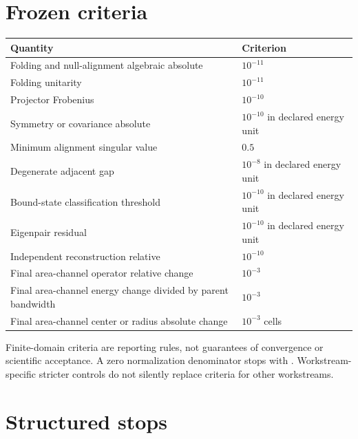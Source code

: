 \documentclass[11pt]{article}
\begin{document}
\section{Frozen criteria}

\begin{center}
\small
\begin{tabularx}{\textwidth}{Y>{\raggedleft\arraybackslash}p{0.28\textwidth}}
\toprule
\textbf{Quantity} & \textbf{Criterion} \\
\midrule
Folding and null-alignment algebraic absolute & $10^{-11}$ \\
Folding unitarity & $10^{-11}$ \\
Projector Frobenius & $10^{-10}$ \\
Symmetry or covariance absolute & $10^{-10}$ in declared energy unit \\
Minimum alignment singular value & $0.5$ \\
Degenerate adjacent gap & $10^{-8}$ in declared energy unit \\
Bound-state classification threshold & $10^{-10}$ in declared energy unit \\
Eigenpair residual & $10^{-10}$ in declared energy unit \\
Independent reconstruction relative & $10^{-10}$ \\
Final area-channel operator relative change & $10^{-3}$ \\
Final area-channel energy change divided by parent bandwidth & $10^{-3}$ \\
Final area-channel center or radius absolute change & $10^{-3}$ cells \\
\bottomrule
\end{tabularx}
\end{center}

Finite-domain criteria are reporting rules, not guarantees of convergence or scientific
acceptance.  A zero normalization denominator stops with
.  Workstream-specific stricter controls do not
silently replace criteria for other workstreams.

\section{Structured stops}
\end{document}
